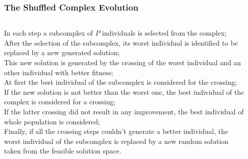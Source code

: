 %
\begin{frame}
\frametitle{The Shuffled Complex Evolution}
\begin{columns}
\begin{column}{0.75\textwidth}  %
  {\small
  In each step a subcomplex of $P$ individuals is selected from the
  complex;
  \\ \medskip \pause
  After the selection of the subcomplex, its worst individual is identified to
  be replaced by a new generated solution;
  \\ \medskip \pause
  This new solution is generated by the crossing of the worst individual and an
  other individual with better fitness;
  \\ \medskip \pause
  At first the best individual of the subcomplex is considered for the crossing;
  \\ \medskip \pause
  If the new solution is not better than the worst one, the best individual
  of the complex is considered for a crossing;
  \\ \medskip \pause
  If the latter crossing did not result in any improvement, the best individual
  of whole population is considered;
  \\ \medskip \pause
  Finally, if all the crossing steps couldn't generate a better individual,
  the worst individual of the subcomplex is replaced by a new random solution taken
  from the feasible solution space.
  }
\end{column} \pause
\begin{column}{0.25\textwidth}

\end{column}
\end{columns}
\end{frame}
